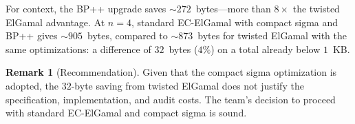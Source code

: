\documentclass[11pt]{article}
\theoremstyle{definition}
\newtheorem{remark}[theorem]{Remark}
\begin{document}
\noindent
For context, the BP++ upgrade saves $\sim 272$~bytes---more than
$8\times$ the twisted ElGamal advantage.
At $n = 4$, standard EC-ElGamal with compact sigma and BP++ gives
$\sim 905$~bytes, compared to $\sim 873$~bytes for twisted ElGamal
with the same optimizations: a difference of $32$~bytes ($4\%$) on a
total already below $1$~KB.

\begin{remark}[Recommendation]
  Given that the compact sigma optimization is adopted, the
  $32$-byte saving from twisted ElGamal does not justify the
  specification, implementation, and audit costs.
  The team's decision to proceed with standard EC-ElGamal and
  compact sigma is sound.
\end{remark}


\end{document}

